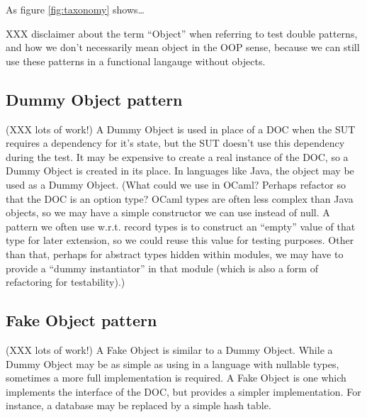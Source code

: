 As figure \ref{fig:taxonomy} shows\dots

XXX disclaimer about the term ``Object'' when referring to test double
patterns, and how we don't necessarily mean object in the OOP sense,
because we can still use these patterns in a functional langauge
without objects.



\subsection{Dummy Object pattern}
\label{testdoubles:dummy}

(XXX lots of work!) A Dummy Object is used in place of a DOC when the
SUT requires a dependency for it's state, but the SUT doesn't use this
dependency during the test. It may be expensive to create a real
instance of the DOC, so a Dummy Object is created in its place. In
languages like Java, the  object may be used as a Dummy
Object. (What could we use in OCaml? Perhaps refactor so that the DOC
is an option type? OCaml types are often less complex than Java
objects, so we may have a simple constructor we can use instead of
null. A pattern we often use w.r.t. record types is to construct an
``empty'' value of that type for later extension, so we could reuse
this value for testing purposes. Other than that, perhaps for abstract
types hidden within modules, we may have to provide a ``dummy
instantiator'' in that module (which is also a form of refactoring for
testability).)


\subsection{Fake Object pattern}
\label{testdoubles:fake}

(XXX lots of work!) A Fake Object is similar to a Dummy Object. While
a Dummy Object may be as simple as using  in a language
with nullable types, sometimes a more full implementation is
required. A Fake Object is one which implements the interface of the
DOC, but provides a simpler implementation. For instance, a database
may be replaced by a simple hash table.

